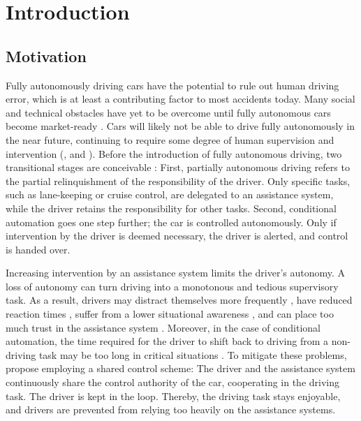 \chapter{Introduction}
\label{sec:intro}

\section{Motivation}

Fully autonomously driving cars have the potential to rule out human driving error, which is at least a contributing factor to most accidents today. Many social and technical obstacles have yet to be overcome until fully autonomous cars become market-ready \parencite{autonomous_driving_book}. Cars will likely not be able to drive fully autonomously in the near future, continuing to require some degree of human supervision and intervention (\cite{human-needed}, and \cite{human-needed-2}). Before the introduction of fully autonomous driving, two transitional stages are conceivable \parencite{shared_control}: First, partially autonomous driving refers to the partial relinquishment of the responsibility of the driver. Only specific tasks, such as lane-keeping or cruise control, are delegated to an assistance system, while the driver retains the responsibility for other tasks. Second, conditional automation goes one step further; the car is controlled autonomously. Only if intervention by the driver is deemed necessary, the driver is alerted, and control is handed over. 

Increasing intervention by an assistance system limits the driver's autonomy. A loss of autonomy can turn driving into a monotonous and tedious supervisory task. As a result, drivers may distract themselves more frequently \parencite{driver-distraction}, have reduced reaction times \parencite{reaction-time}, suffer from a lower situational awareness \parencite{situational-awareness}, and can place too much trust in the assistance system \parencite{over-trust}. Moreover, in the case of conditional automation, the time required for the driver to shift back to driving from a non-driving task may be too long in critical situations \parencite{takeover-time}. To mitigate these problems, \cite{shared-control-haptics} propose employing a shared control scheme: The driver and the assistance system continuously share the control authority of the car, cooperating in the driving task. The driver is kept in the loop. Thereby, the driving task stays enjoyable, and drivers are prevented from relying too heavily on the assistance systems.

